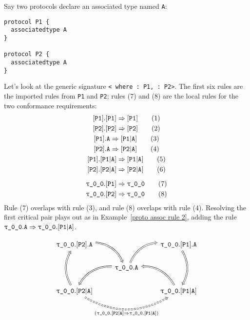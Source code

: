 \documentclass[../generics]{subfiles}
\begin{document}
\begin{example}
Say two protocols declare an associated type named \texttt{A}:
\begin{Verbatim}
protocol P1 {
  associatedtype A
}

protocol P2 {
  associatedtype A
}
\end{Verbatim}
Let's look at the generic signature \texttt{< where :~P1, :~P2>}. The first six rules are the imported rules from \texttt{P1} and \texttt{P2}; rules (7) and (8) are the local rules for the two conformance requirements:
\begin{gather*}
\ProtoConf{\protosym{P1}}{P1}\tag{1}\\
\ProtoConf{\protosym{P2}}{P2}\tag{2}\\
\AssocIntro{P1}{A}\tag{3}\\
\AssocIntro{P2}{A}\tag{4}\\
\protosym{P1}.\assocsym{P1}{A}\Rightarrow\assocsym{P1}{A}\tag{5}\\
\protosym{P2}.\assocsym{P2}{A}\Rightarrow\assocsym{P2}{A}\tag{6}\\[\medskipamount]
\ProtoConf{\ttgp{0}{0}}{P1}\tag{7}\\
\ProtoConf{\ttgp{0}{0}}{P2}\tag{8}
\end{gather*}
Rule (7) overlaps with rule (3), and rule (8) overlaps with rule (4). Resolving the first critical pair plays out as in Example~\ref{proto assoc rule 2}, adding the rule $\texttt{$\uptau$\_0\_0}.\texttt{A}\Rightarrow\texttt{$\uptau$\_0\_0}.[\texttt{P1}|\texttt{A}]$.

\[
\begin{tikzcd}
\ttgp{0}{0}.\protosym{P2}.\texttt{A}
\arrow[rd, Rightarrow, bend left]
&&\ttgp{0}{0}.\protosym{P1}.\texttt{A}
\arrow[dd, Rightarrow, bend left]
\\
&\ttgp{0}{0}.\texttt{A}
\arrow[ld, Rightarrow, bend right]
\arrow[ru, Rightarrow, bend left]
\\
\ttgp{0}{0}.\assocsym{P2}{A}
\arrow[rr, Rightarrow, bend right, dashed, "(\ttgp{0}{0}.\assocsym{P2}{A}\Rightarrow\ttgp{0}{0}.\assocsym{P1}{A})"']
\arrow[uu, Rightarrow, bend left]
&&\ttgp{0}{0}.\assocsym{P1}{A}
\arrow[ul, Rightarrow, bend right]
\end{tikzcd}
\]


\end{example}
\end{document}

